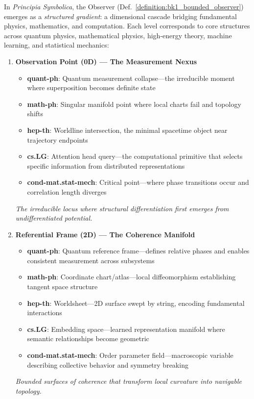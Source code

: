 \begin{definition}
\label{definition:bk1_observer_gradient}
\leavevmode\newline
In \textit{Principia Symbolica}, the Observer (Def.~\ref{definition:bk1_bounded_observer}) emerges as a \textit{structured gradient}: a dimensional cascade bridging fundamental physics, mathematics, and computation. Each level corresponds to core structures across quantum physics, mathematical physics, high-energy theory, machine learning, and statistical mechanics:

\begin{enumerate}
  \item \textbf{Observation Point (0D) — The Measurement Nexus}  
  \begin{itemize}
    \item \textbf{quant-ph}: Quantum measurement collapse—the irreducible moment where superposition becomes definite state
    \item \textbf{math-ph}: Singular manifold point where local charts fail and topology shifts
    \item \textbf{hep-th}: Worldline intersection, the minimal spacetime object near trajectory endpoints
    \item \textbf{cs.LG}: Attention head query—the computational primitive that selects specific information from distributed representations
    \item \textbf{cond-mat.stat-mech}: Critical point—where phase transitions occur and correlation length diverges
  \end{itemize}
  \textit{The irreducible locus where structural differentiation first emerges from undifferentiated potential.}

  \item \textbf{Referential Frame (2D) — The Coherence Manifold}  
  \begin{itemize}
    \item \textbf{quant-ph}: Quantum reference frame—defines relative phases and enables consistent measurement across subsystems
    \item \textbf{math-ph}: Coordinate chart/atlas—local diffeomorphism establishing tangent space structure
    \item \textbf{hep-th}: Worldsheet—2D surface swept by string, encoding fundamental interactions
    \item \textbf{cs.LG}: Embedding space—learned representation manifold where semantic relationships become geometric
    \item \textbf{cond-mat.stat-mech}: Order parameter field—macroscopic variable describing collective behavior and symmetry breaking
  \end{itemize}
  \textit{Bounded surfaces of coherence that transform local curvature into navigable topology.}


\end{enumerate}
\end{definition}
